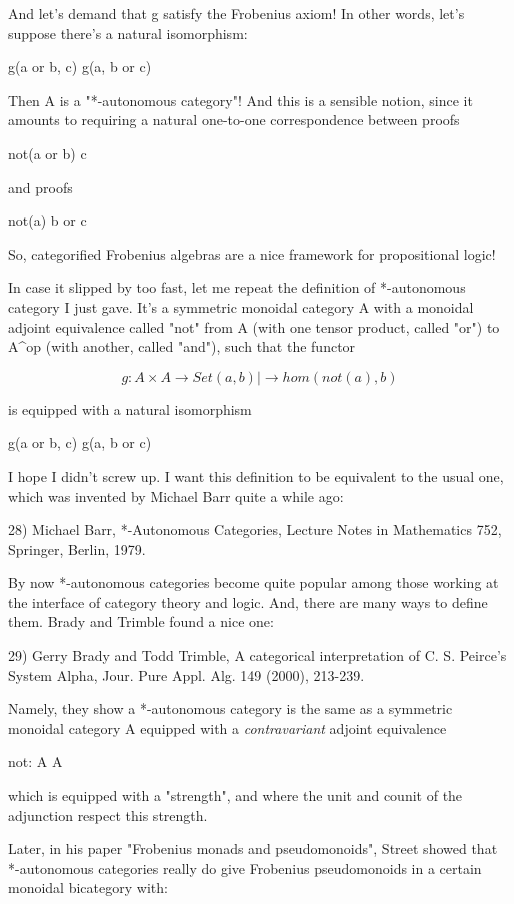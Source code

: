 And let's demand that g satisfy the Frobenius
axiom!  In other words, let's suppose there's a natural
isomorphism:

g(a or b, c) \cong  g(a, b or c)

Then A is a "*-autonomous category"!  And this is 
a sensible notion, since it amounts to requiring a natural
one-to-one correspondence between proofs

not(a or b) \to  c

and proofs

not(a) \to  b or c

So, categorified Frobenius algebras are a nice framework for
propositional logic!

In case it slipped by too fast, let me repeat the definition of
*-autonomous category I just gave.  It's a symmetric monoidal
category A with a monoidal adjoint
equivalence called "not" from A (with one tensor product,
called "or") to A^{op} (with another, called 
"and"), such that the functor 


$$

g: A \times  A  \to  Set
   (a,b) |\to  hom(not(a),b)
$$
    

is equipped with a natural isomorphism 

g(a or b, c) \cong  g(a, b or c)

I hope I didn't screw up.  I want this definition to
be equivalent to the usual one,
which was invented by Michael Barr quite a while ago:

28) Michael Barr, *-Autonomous Categories, Lecture Notes in 
Mathematics 752, Springer, Berlin, 1979.

By now *-autonomous categories become quite popular among those
working at the interface of category theory and logic.  And, there
are many ways to define them.  Brady and Trimble found a nice one:

29) Gerry Brady and Todd Trimble, A categorical interpretation 
of C. S. Peirce's System Alpha, Jour. Pure Appl. Alg. 149
(2000), 213-239.  

Namely, they show a *-autonomous category is the same as a symmetric
monoidal category A equipped with a \emph{contravariant} 
adjoint equivalence

not: A \to  A 

which is equipped with a "strength", and where the unit and counit of 
the adjunction respect this strength.

Later, in his paper "Frobenius monads and pseudomonoids", Street 
showed that *-autonomous categories really do give Frobenius 
pseudomonoids in a certain monoidal bicategory with:

